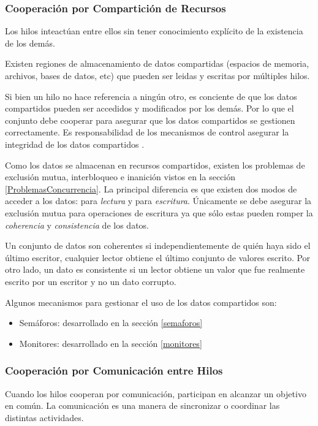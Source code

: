 \subsubsection{Cooperación por Compartición de Recursos}

Los hilos inteactúan entre ellos sin tener conocimiento explícito de la
existencia de los demás.

Existen regiones de almacenamiento de datos compartidas (espacios de memoria,
archivos, bases de datos, etc) que pueden ser leidas y escritas por múltiples
hilos.

Si bien un hilo no hace referencia a ningún otro, es conciente de que los
datos compartidos pueden ser accedidos y modificados por los demás. Por lo que
el conjunto debe cooperar para asegurar que los datos compartidos se gestionen
correctamente. Es responsabilidad de los mecanismos de control asegurar la
integridad de los datos compartidos \cite{SistOpStallings}.

Como los datos se almacenan en recursos compartidos, existen los problemas de
exclusión mutua, interbloqueo e inanición vistos en la sección
\ref{ProblemasConcurrencia}. La principal diferencia es que existen dos modos de
acceder a los datos: para \textit{lectura} y para \textit{escritura}. Únicamente
se debe asegurar la exclusión mutua para operaciones de escritura ya que sólo
estas pueden romper la \textit{coherencia} y \textit{consistencia} de los datos.

Un conjunto de datos son coherentes si independientemente de quién haya sido el
último escritor, cualquier lector obtiene el último conjunto de valores escrito.
Por otro lado, un dato es consistente si un lector obtiene un valor que fue
realmente escrito por un escritor y no un dato corrupto.

Algunos mecanismos para gestionar el uso de los datos compartidos son:
\begin{itemize}
    \item Semáforos: desarrollado en la sección \ref{semaforos}
    \item Monitores: desarrollado en la sección \ref{monitores}
\end{itemize}

\subsubsection{Cooperación por Comunicación entre Hilos}

Cuando los hilos cooperan por comunicación, participan en alcanzar un
objetivo en común. La comunicación es una manera de sincronizar o coordinar las
distintas actividades.

